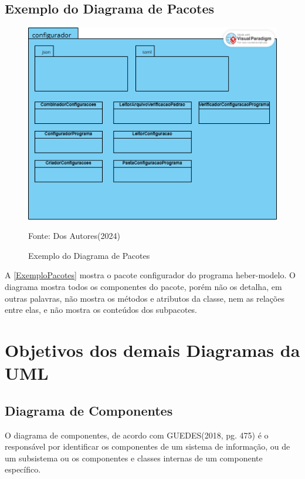 \documentclass[12pt,openright,oneside,a4paper,
	chapter=TITLE,
	section=TITLE,
	english,brazil]{abntex2}
\begin{document}
\section{Exemplo do Diagrama de Pacotes}

\begin{figure}[!htp]
	\caption{Exemplo do Diagrama de Pacotes}
	\centering
	\includegraphics[scale=0.5]{img/ExemploDiagramaPacotes.png}
	\\

	\label{ExemploPacotes}
	\footnotesize\raggedright Fonte: Dos Autores(2024)
\end{figure}

A \autoref{ExemploPacotes} mostra o pacote configurador do programa heber-modelo. O diagrama mostra todos os componentes do pacote, porém não os detalha, em outras palavras, não mostra os métodos e atributos da classe, nem as relações entre elas, e não mostra os conteúdos dos subpacotes.


\chapter{Objetivos dos demais Diagramas da UML}

\section{Diagrama de Componentes}

O diagrama de componentes, de acordo com GUEDES(2018, pg. 475) é o responsável por identificar os componentes de um sistema de informação, ou de um subsistema ou os componentes e classes internas de um componente específico.
\end{document}
